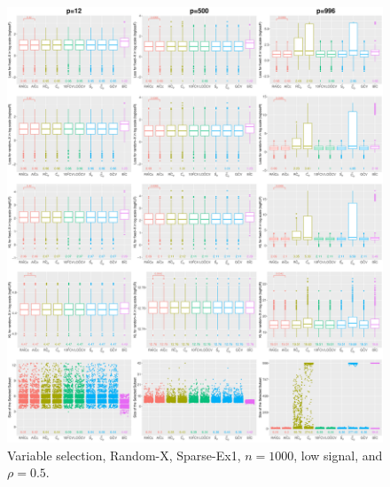 \begin{figure}[!ht]
\centering
\includegraphics[width=\textwidth]{figures/supplement/randomx/subset_selection/Sparse-Ex1_n1000_lsnr_rho05.eps}
\caption{Variable selection, Random-X, Sparse-Ex1, $n=1000$, low signal, and $\rho=0.5$.}
\end{figure}
\clearpage
